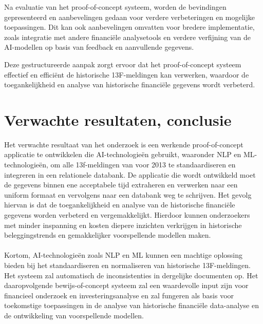 Na evaluatie van het proof-of-concept systeem, worden de bevindingen gepresenteerd en aanbevelingen gedaan voor verdere verbeteringen en mogelijke toepassingen. Dit kan ook aanbevelingen omvatten voor bredere implementatie, zoals integratie met andere financiële analysetools en verdere verfijning van de AI-modellen op basis van feedback en aanvullende gegevens.

Deze gestructureerde aanpak zorgt ervoor dat het proof-of-concept systeem effectief en efficiënt de historische 13F-meldingen kan verwerken, waardoor de toegankelijkheid en analyse van historische financiële gegevens wordt verbeterd.



\section{Verwachte resultaten, conclusie}%
\label{sec:verwachte_resultaten}


Het verwachte resultaat van het onderzoek is een werkende proof-of-concept applicatie te ontwikkelen die AI-technologieën gebruikt, waaronder NLP en ML- technologieën, om alle 13f-meldingen van voor 2013 te standaardiseren en integreren in een relationele databank. De applicatie die wordt ontwikkeld moet de gegevens binnen ene acceptabele tijd extraheren en verwerken naar een uniform formaat en vervolgens naar een databank weg te schrijven.  Het gevolg hiervan is dat de toegankelijkheid en analyse van de historische financiële gegevens worden verbeterd en vergemakkelijkt. Hierdoor kunnen onderzoekers met minder inspanning en kosten diepere inzichten verkrijgen in historische beleggingstrends en gemakkelijker voorspellende modellen maken. 
\\
\\
Kortom, AI-technologieën zoals NLP en ML kunnen een machtige oplossing bieden bij het standaardiseren en normaliseren van historische 13F-meldingen. Het systeem zal automatisch de inconsistenties in dergelijke documenten op. Het daaropvolgende bewijs-of-concept systeem zal een waardevolle input zijn voor financieel onderzoek en investeringsanalyse en zal fungeren als basis voor toekomstige toepassingen in de analyse van historische financiële data-analyse en de ontwikkeling van voorspellende modellen.
